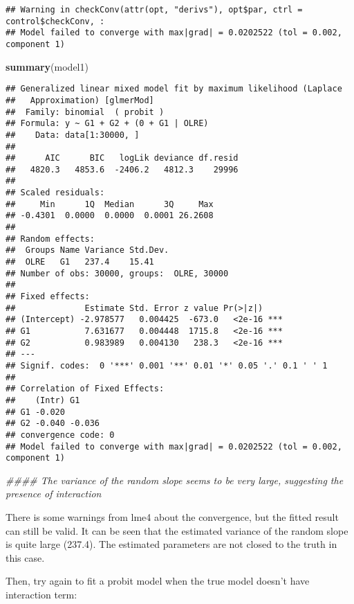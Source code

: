 \documentclass[]{article}
\newenvironment{Shaded}{\begin{snugshade}}{\end{snugshade}}
\newcommand{\CommentTok}[1]{\textcolor[rgb]{0.56,0.35,0.01}{\textit{#1}}}
\newcommand{\KeywordTok}[1]{\textcolor[rgb]{0.13,0.29,0.53}{\textbf{#1}}}
\newcommand{\NormalTok}[1]{#1}
\begin{document}
\begin{verbatim}
## Warning in checkConv(attr(opt, "derivs"), opt$par, ctrl = control$checkConv, :
## Model failed to converge with max|grad| = 0.0202522 (tol = 0.002, component 1)
\end{verbatim}

\begin{Shaded}
\begin{Highlighting}[]
\KeywordTok{summary}\NormalTok{(model1)}
\end{Highlighting}
\end{Shaded}

\begin{verbatim}
## Generalized linear mixed model fit by maximum likelihood (Laplace
##   Approximation) [glmerMod]
##  Family: binomial  ( probit )
## Formula: y ~ G1 + G2 + (0 + G1 | OLRE)
##    Data: data[1:30000, ]
## 
##      AIC      BIC   logLik deviance df.resid 
##   4820.3   4853.6  -2406.2   4812.3    29996 
## 
## Scaled residuals: 
##     Min      1Q  Median      3Q     Max 
## -0.4301  0.0000  0.0000  0.0001 26.2608 
## 
## Random effects:
##  Groups Name Variance Std.Dev.
##  OLRE   G1   237.4    15.41   
## Number of obs: 30000, groups:  OLRE, 30000
## 
## Fixed effects:
##              Estimate Std. Error z value Pr(>|z|)    
## (Intercept) -2.978577   0.004425  -673.0   <2e-16 ***
## G1           7.631677   0.004448  1715.8   <2e-16 ***
## G2           0.983989   0.004130   238.3   <2e-16 ***
## ---
## Signif. codes:  0 '***' 0.001 '**' 0.01 '*' 0.05 '.' 0.1 ' ' 1
## 
## Correlation of Fixed Effects:
##    (Intr) G1    
## G1 -0.020       
## G2 -0.040 -0.036
## convergence code: 0
## Model failed to converge with max|grad| = 0.0202522 (tol = 0.002, component 1)
\end{verbatim}

\begin{Shaded}
\begin{Highlighting}[]
\CommentTok{#### The variance of the random slope seems to be very large, suggesting the presence of interaction}
\end{Highlighting}
\end{Shaded}

There is some warnings from lme4 about the convergence, but the fitted
result can still be valid. It can be seen that the estimated variance of
the random slope is quite large (237.4). The estimated parameters are
not closed to the truth in this case.

Then, try again to fit a probit model when the true model doesn't have
interaction term:
\end{document}
